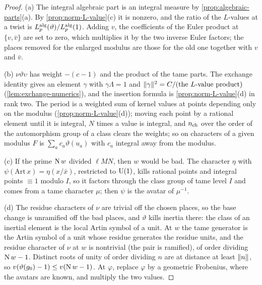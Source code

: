 \begin{proof}
(a) The integral algebraic part is an integral measure by \cref{prop:algebraic-parts}(a). By \cref{prop:norm-L-value}(c) it is nonzero, and the ratio of the $L$-values at a twist is $L^{\rm alg}_p(\vartheta)/L^{\rm alg}_p(1)$. Adding $v$, the coefficients of the Euler product at $\{v,\bar v\}$ are set to zero, which multiplies it by the two inverse Euler factors; the places
removed for the enlarged modulus are those for the old one together with $v$ and $\bar v$.

(b) $\nu\vartheta\upsilon$ has weight $-(c-1)$ and the product of the tame parts. The exchange identity gives an element $\gamma$ with $\gamma\Lambda=1$ and $\lVert \gamma\rVert^2=C/(\text{the }L\text{-value product})$ (\cref{lem:exchange-numerics}), and the insertion formula is \cref{prop:norm-L-value}(d) in rank two. The period is a weighted sum of kernel values at points depending only on the
modulus (\cref{prop:norm-L-value}(d)); moving each point by a rational element until it is integral, $N$ times a value is integral, and $n_{\rm ch}$ over the order of the automorphism group of a class clears the weights; so on characters of a given modulus $F$ is $\sum_ac_a\vartheta(u_a)$ with $c_a$ integral away from the modulus.

(c) If the prime $\operatorname{N} w$ divided $\ell MN$, then $w$ would be bad. The character $\eta$ with $\psi(\mathrm{Art}\,x)=\eta(x/\bar x)$, restricted to $\operatorname{U}(1)$, kills rational points and integral points $\equiv1$ modulo $I$, so it factors through the class group of tame level $I$ and comes from a tame character $\mu$; then $\psi$ is the avatar of $\mu^{-1}$.

(d) The residue characters of $\nu$ are trivial off the chosen places, so the base change is unramified off the bad places, and $\vartheta$ kills inertia there: the class of an inertial element is the local Artin symbol of a unit. At $w$ the tame generator is the Artin symbol of a unit whose residue generates the residue units, and the residue character of $\nu$ at $w$ is
nontrivial (the pair is ramified), of order dividing $\operatorname{N} w-1$. Distinct roots of unity of order dividing $n$ are at distance at least $\lVert n\rVert$, so $v(\vartheta(g_0)-1)\le v(\operatorname{N} w-1)$. At $\varphi$, replace $\varphi$ by a geometric Frobenius, where the avatars are known, and multiply the two values.
\end{proof}

